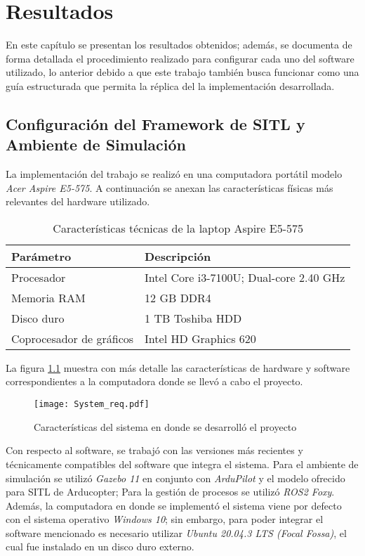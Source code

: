 \chapter{Resultados}

En este capítulo se presentan los resultados obtenidos; además, se documenta de forma detallada el procedimiento realizado para configurar cada uno del software utilizado, lo anterior debido a que este trabajo también busca funcionar como una guía estructurada que permita la réplica del la implementación desarrollada.

\section{Configuración del Framework de SITL y Ambiente de Simulación}
La implementación del trabajo se realizó en una computadora portátil modelo \textit{Acer Aspire E5-575}. A continuación se anexan las características físicas más relevantes del hardware utilizado.

\begin{table}
    \centering
    \begin{tabular}{||l|l||}
        \hline
        Parámetro & Descripción\\
        \hline
        Procesador & Intel Core i3-7100U; Dual-core 2.40 GHz\\
        Memoria RAM & 12 GB DDR4\\
        Disco duro & 1 TB Toshiba HDD\\
        Coprocesador de gráficos & Intel HD Graphics 620\\
        \hline
    \end{tabular}
    \caption{Características técnicas de la laptop Aspire E5-575}
    \label{tab:specs}
\end{table}

La figura \ref{fig:req} muestra con más detalle las características de hardware y software correspondientes a la computadora donde se llevó a cabo el proyecto. 

\begin{figure}[ht]
    \centering
    \texttt{[image: System\_req.pdf]}
    \caption{Características del sistema en donde se desarrolló el proyecto}
    \label{fig:req}
\end{figure}

Con respecto al software, se trabajó con las versiones más recientes y técnicamente compatibles del software que integra el sistema. Para el ambiente de simulación se utilizó \textit{Gazebo 11} en conjunto con \textit{ArduPilot} y el modelo ofrecido para SITL de Arducopter; Para la gestión de procesos se utilizó \textit{ROS2 Foxy}. Además, la computadora en donde se implementó el sistema viene por defecto con el sistema operativo \textit{Windows 10}; sin embargo, para poder integrar el software mencionado es necesario utilizar \textit{Ubuntu 20.04.3 LTS (Focal Fossa)}, el cual fue instalado en un disco duro externo.

